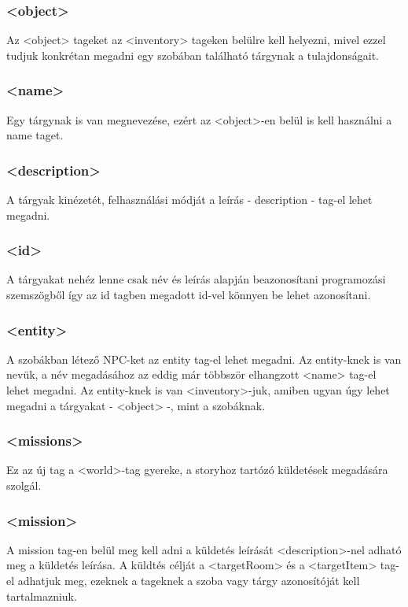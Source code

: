 \documentclass{scrarticle}
\begin{document}
\subsubsection{<object>}
Az <object> tageket az <inventory> tageken belülre kell helyezni, mivel ezzel tudjuk konkrétan megadni egy szobában található tárgynak a tulajdonságait.

\subsubsection{<name>}
Egy tárgynak is van megnevezése, ezért az <object>-en belül is kell használni a name taget.

\subsubsection{<description>}
A tárgyak kinézetét, felhasználási módját a leírás - description - tag-el lehet megadni.

\subsubsection{<id>}
A tárgyakat nehéz lenne csak név és leírás alapján beazonosítani programozási szemszögből így az id tagben megadott id-vel könnyen be lehet azonosítani.

\subsubsection{<entity>}
A szobákban létező NPC-ket az entity tag-el lehet megadni. Az entity-knek is van nevük, a név megadásához az eddig már többször elhangzott <name> tag-el lehet megadni. Az entity-knek is van <inventory>-juk, amiben ugyan úgy lehet megadni a tárgyakat - <object> -, mint a szobáknak.

\subsubsection{<missions>}
Ez az új tag a <world>-tag gyereke, a storyhoz tartózó küldetések megadására szolgál.

\subsubsection{<mission>}
A mission tag-en belül meg kell adni a küldetés leírását <description>-nel adható meg a küldetés leírása. A küldtés célját a <targetRoom> és a <targetItem> tag-el adhatjuk meg, ezeknek a tageknek a szoba vagy tárgy azonosítóját kell tartalmazniuk.
\end{document}
